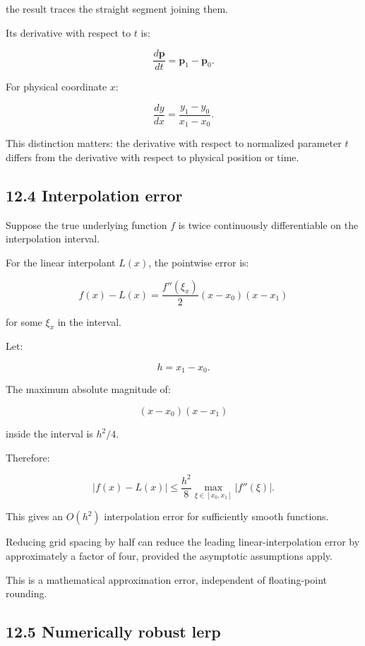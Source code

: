 the result traces the straight segment joining them.

Its derivative with respect to \(t\) is:

\[ \boxed{ \frac{d\mathbf p}{dt} = \mathbf p_1-\mathbf p_0 }. \]

For physical coordinate \(x\):

\[ \boxed{ \frac{dy}{dx} = \frac{y_1-y_0}{x_1-x_0} }. \]

This distinction matters: the derivative with respect to normalized parameter \(t\) differs from the derivative with respect to physical position or time.

\subsection{12.4 Interpolation error}\label{02-foundations-ii-ch028-interpolation-error}

\hypertarget{02-foundations-ii-ch028-interpolation-error}{}

Suppose the true underlying function \(f\) is twice continuously differentiable on the interpolation interval.

For the linear interpolant \(L(x)\), the pointwise error is:

\[ \boxed{ f(x)-L(x) = \frac{f''(\xi_x)}2 (x-x_0)(x-x_1) } \]

for some \(\xi_x\) in the interval.

Let:

\[ h=x_1-x_0. \]

The maximum absolute magnitude of:

\[ (x-x_0)(x-x_1) \]

inside the interval is \(h^2/4\).

Therefore:

\[ \boxed{ |f(x)-L(x)| \le \frac{h^2}{8} \max_{\xi\in[x_0,x_1]}|f''(\xi)| }. \]

This gives an \(O(h^2)\) interpolation error for sufficiently smooth functions.

Reducing grid spacing by half can reduce the leading linear-interpolation error by approximately a factor of four, provided the asymptotic assumptions apply.

This is a mathematical approximation error, independent of floating-point rounding.

\subsection{12.5 Numerically robust lerp}\label{02-foundations-ii-ch028-numerically-robust-lerp}

